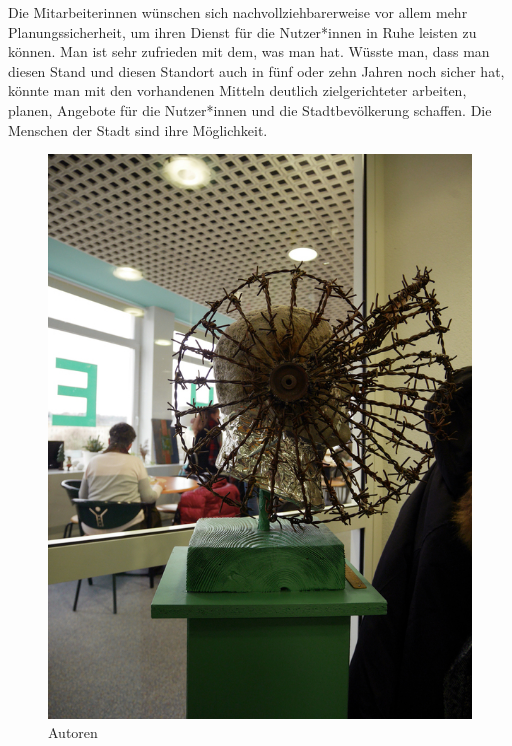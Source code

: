 \documentclass[a4paper,
fontsize=11pt,
oneside,
numbers=noperiodatend,
parskip=half-,
bibliography=totoc,
final
]{scrartcl}
\begin{document}
Die Mitarbeiterinnen wünschen sich nachvollziehbarerweise vor allem mehr
Planungssicherheit, um ihren Dienst für die Nutzer*innen in Ruhe leisten
zu können. Man ist sehr zufrieden mit dem, was man hat. Wüsste man, dass
man diesen Stand und diesen Standort auch in fünf oder zehn Jahren noch
sicher hat, könnte man mit den vorhandenen Mitteln deutlich
zielgerichteter arbeiten, planen, Angebote für die Nutzer*innen und die
Stadtbevölkerung schaffen. Die Menschen der Stadt sind ihre Möglichkeit.

\begin{figure}
\centering
\includegraphics{img/image_6.jpg}
\caption{Autoren}
\end{figure}
\end{document}
